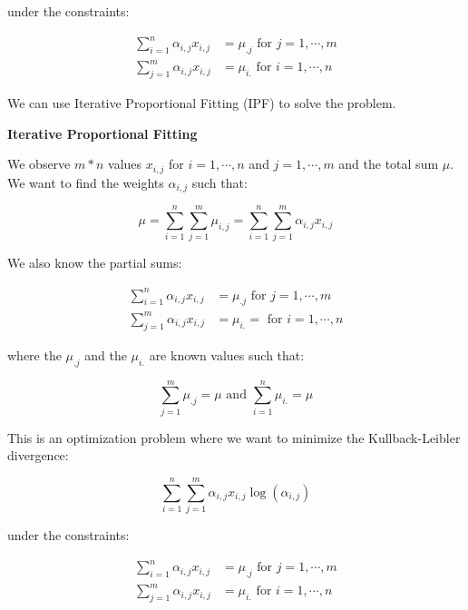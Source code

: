 under the constraints:

\begin{align*}
\sum_{i = 1}^n \alpha_{i,j} x_{i,j} &= \mu_{.j} \text{ for } j = 1 , \cdots , m \\
\sum_{j = 1}^m \alpha_{i,j} x_{i,j} &= \mu_{i.} \text{ for } i = 1 , \cdots , n
\end{align*}

We can use Iterative Proportional Fitting (IPF) to solve the problem.

\vspace{1em}

\textbf{Iterative Proportional Fitting}

\vspace{1em}

We observe $m * n$ values $x_{i,j}$ for $i = 1 , \cdots , n$ and $j = 1 , \cdots , m$ and the total sum $\mu$. We want to find the weights $\alpha_{i,j}$ such that:

\begin{equation*}
\mu = \sum_{i = 1}^n \sum_{j = 1}^m \mu_{i,j} = \sum_{i = 1}^n \sum_{j = 1}^m \alpha_{i,j} x_{i,j}
\end{equation*}

We also know the partial sums:

\begin{align*}
\sum_{i = 1}^n \alpha_{i,j} x_{i,j} &= \mu_{.j} \text{ for } j = 1 , \cdots , m \\
\sum_{j = 1}^m \alpha_{i,j} x_{i,j} &= \mu_{i.} = \text{ for } i = 1 , \cdots , n
\end{align*}

where the $\mu_{.j}$ and the $\mu_{i.}$ are known values such that:

\begin{equation*}
\sum_{j = 1}^m \mu_{.j} = \mu \text{ and } \sum_{i = 1}^n \mu_{i.} = \mu
\end{equation*}

This is an optimization problem where we want to minimize the Kullback-Leibler divergence:

\begin{equation*}
\sum_{i = 1}^n \sum_{j = 1}^m \alpha_{i,j} x_{i,j} \log \left( \alpha_{i,j} \right)
\end{equation*}

under the constraints:

\begin{align*}
\sum_{i = 1}^n \alpha_{i,j} x_{i,j} &= \mu_{.j} \text{ for } j = 1 , \cdots , m \\
\sum_{j = 1}^m \alpha_{i,j} x_{i,j} &= \mu_{i.} \text{ for } i = 1 , \cdots , n
\end{align*}

